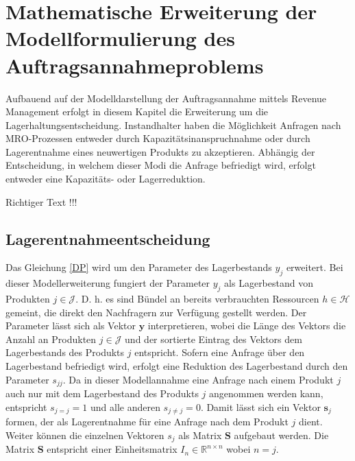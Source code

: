 

\section{Mathematische Erweiterung der Modellformulierung des Auftragsannahmeproblems}

Aufbauend auf der Modelldarstellung der Auftragsannahme mittels Revenue Management erfolgt in diesem Kapitel die Erweiterung um die Lagerhaltungsentscheidung. Instandhalter haben die Möglichkeit Anfragen nach MRO-Prozessen entweder durch Kapazitätsinanspruchnahme oder durch Lagerentnahme eines neuwertigen Produkts zu akzeptieren. Abhängig der Entscheidung, in welchem dieser Modi die Anfrage befriedigt wird, erfolgt entweder eine Kapazitäts- oder Lagerreduktion.

Richtiger Text !!!

\subsection{Lagerentnahmeentscheidung}

Das Gleichung \eqref{DP} wird um den Parameter des Lagerbestands $y_{j}$ erweitert. Bei dieser Modellerweiterung fungiert der Parameter $y_{j}$ als Lagerbestand von Produkten $j\in\mathcal{J}$. D. h. es sind Bündel an bereits verbrauchten Ressourcen $h\in\mathcal{H}$ gemeint, die direkt den Nachfragern zur Verfügung gestellt werden. Der Parameter lässt sich als Vektor $\textbf{y}$ interpretieren, wobei die Länge des Vektors die Anzahl an Produkten $j\in\mathcal{J}$ und der sortierte Eintrag des Vektors dem Lagerbestands des Produkts $j$ entspricht. Sofern eine Anfrage über den Lagerbestand befriedigt wird, erfolgt eine Reduktion des Lagerbestand durch den Parameter $s_{jj}$. Da in dieser Modellannahme eine Anfrage nach einem Produkt $j$ auch nur mit dem Lagerbestand des Produkts $j$ angenommen werden kann, entspricht $s_{j=j}=1$ und alle anderen $s_{j\neq j}=0$. Damit lässt sich ein Vektor $\textbf{s}_j$ formen, der als Lagerentnahme für eine Anfrage nach dem Produkt $j$ dient. Weiter können die einzelnen Vektoren $s_{j}$ als Matrix $\textbf{S}$ aufgebaut werden. Die Matrix $\textbf{S}$ entspricht einer Einheitsmatrix $I_{n}\in\mathbb{R}^{n\times n}$ wobei $n=j$.

